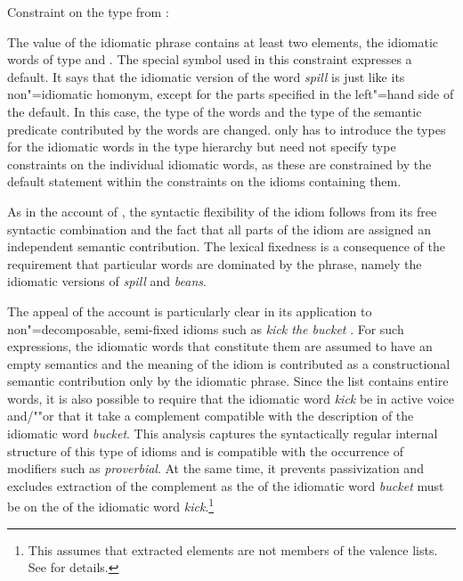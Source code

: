\documentclass[output=paper,biblatex,babelshorthands,newtxmath,draftmode,colorlinks,citecolor=brown]{langscibook}
\begin{document}
\vbox{
\ea Constraint on the type  from \citet[185]{Riehemann2001a}:\label{sr-spillbeans}\\
\z 
}

\noindent
The  value of the idiomatic phrase contains at least two elements, the idiomatic words
of type  and .  The special symbol {\scriptsize \srdefault} used in
this constraint expresses a default. It says that the idiomatic version of the word
\emph{spill} is just like its non"=idiomatic homonym, except for the parts specified in the
left"=hand side of the default.  In this case, the type of the words and the type of the semantic
predicate contributed by the words are changed.  \citet{Riehemann2001a} only has to introduce the
types for the idiomatic words in the type hierarchy but need not specify type constraints on the
individual idiomatic words, as these are constrained by the default statement within the constraints
on the idioms containing them.

\largerpage
As in the account of \citet{KE94a}, the syntactic flexibility of the idiom follows from its free
syntactic combination and the fact that all parts of the idiom are assigned an independent semantic
contribution. The lexical fixedness is a consequence of the requirement that particular words are
dominated by the phrase, namely the idiomatic versions of \emph{spill} and \emph{beans}.

The appeal of the account is particularly clear in its application to non"=de\-com\-posable,
semi-fixed idioms such as \emph{kick the bucket} \citep[]{Riehemann2001a}.  For such
expressions, the idiomatic words that constitute them are assumed to have an empty semantics and the
meaning of the idiom is contributed as a constructional semantic contribution only by the idiomatic
phrase.  Since the  list contains entire words, it is also possible to require that the
idiomatic word \emph{kick} be in active voice and/""or that it take a complement compatible with the
description of the idiomatic word \emph{bucket}.  This analysis captures the syntactically regular
internal structure of this type of idioms and is compatible with the occurrence of modifiers such as
\emph{proverbial}. At the same time, it prevents passivization and excludes extraction of the
complement as the \synsemv of the idiomatic word \emph{bucket} must be on the \compsl of the
idiomatic word \emph{kick}.\footnote{%
This assumes that extracted elements are not members of the valence lists. See
\crossrefchapterw[\pageref{udc:ex-slashed-verb-traceless}]{udc} for details.
}
\end{document}
